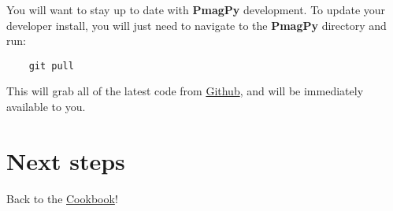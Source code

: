 \documentclass[11pt]{article}
\begin{document}
    You will want to stay up to date with {\bf PmagPy} development.  To update your developer install, you will just need to navigate to the {\bf PmagPy} directory and run:

\begin{verbatim}
    git pull
\end{verbatim}

This will grab all of the latest code from \href{https://github.com/PmagPy/PmagPy}{Github}, and will be immediately available to you.


\section{Next steps}

Back to the \href{https://earthref.org/PmagPy/cookbook/#next_steps}{Cookbook}!
\end{document}

